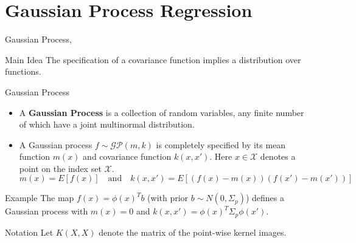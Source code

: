 \documentclass[10pt]{beamer}
\begin{document}
\section{Gaussian Process Regression}


\begin{frame}{Gaussian Process}{\cite[Chapter 21]{BDA13}, \cite[Chapter 2.2]{RW05}}
\begin{block}{Main Idea}
The specification of a covariance function implies a distribution over functions.
\end{block}
\begin{block}{Gaussian Process}
\begin{itemize}
\item A {\bf Gaussian Process} is a collection of random variables, any finite number of which have a joint multinormal distribution. \\
\item A Gaussian process $f \sim \mathcal{GP}(m, k)$ is completely specified by its mean function $m(x)$ and covariance function $k(x, x')$. Here $x \in \mathcal{X}$ denotes a point on the index set $\mathcal{X}$.
$$
m(x) = E[f(x)]
\quad
\text{and}
\quad
k(x, x') = E[(f(x) - m(x))(f(x') - m(x'))]
$$
\end{itemize}
\end{block}
\pause 
\begin{block}{Example}
The map $f(x) = \phi(x)^T b $ (with prior $b\sim N(0, \Sigma_p)$) defines a Gaussian process with $m(x)=0$ and $k(x, x') = \phi(x)^T\Sigma_p\phi(x')$.
\end{block}
\begin{block}{Notation}
Let $K(X, X)$ denote the matrix of the point-wise kernel images. 
\end{block}
\end{frame}
\end{document}
